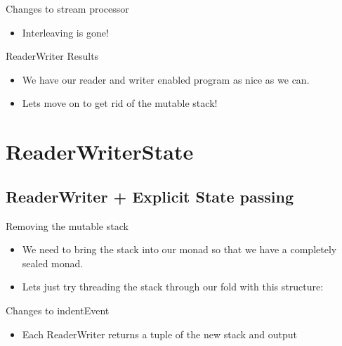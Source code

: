 \documentclass[professionalFonts,aspectratio=169]{beamer}
\begin{document}
\begin{frame}{Changes to stream processor}

\begin{itemize}
\item Interleaving is gone!
\end{itemize}



\end{frame}

\begin{frame}{ReaderWriter Results}

\begin{itemize}
\item We have our reader and writer enabled program as nice as we can.
\item Lets move on to get rid of the mutable stack!
\end{itemize}

\end{frame}

\section{ReaderWriterState}

\subsection{ReaderWriter + Explicit State passing}

\begin{frame}{Removing the mutable stack}
\begin{itemize}
\item We need to bring the stack into our monad so that we have a completely sealed monad.
\pause \item Lets just try threading the stack through our fold with this structure:
\end{itemize}


\pause



\end{frame}

\begin{frame}{Changes to indentEvent}
\begin{itemize}
\item Each ReaderWriter returns a tuple of the new stack and output
\end{itemize}

\pause



\end{frame}
\end{document}

